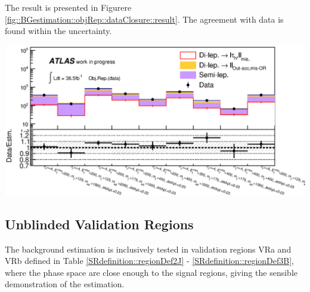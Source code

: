 The result is presented in Figurere \ref{fig::BGestimation::objRep::dataClosure::result}. The agreement with data is found within the uncertainty.

\includegraphics[width=180mm]{figures/BGestimation/ObjReplacement/dataClosure/hist_regionYields_myVRsOnly_wide_metTrig0_NoSys_mode0.eps}
\label{fig::BGestimation::objRep::dataClosure::result}


%


\clearpage
\subsection{Unblinded Validation Regions}
The background estimation is inclusively tested in validation regions VRa and VRb defined in Table \ref{SRdefinition::regionDef2J} - \ref{SRdefinition::regionDef3B},
where the phase space are close enough to the signal regions, giving the sensible demonstration of the estimation. \\

